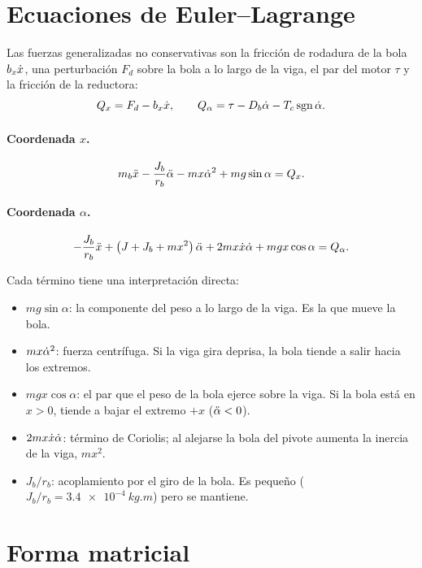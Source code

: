 \section{Ecuaciones de Euler--Lagrange}

Las fuerzas generalizadas no conservativas son la fricción de rodadura de la bola $b_x\dot{x}$, una perturbación $F_d$ sobre la bola a lo largo de la viga, el par del motor $\tau$ y la fricción de la reductora:
\begin{equation}
  Q_x = F_d - b_x\dot{x},\qquad
  Q_\alpha = \tau - D_b\dot{\alpha} - T_c\operatorname{sgn}\dot{\alpha} .
\end{equation}

\paragraph{Coordenada $x$.}
\begin{equation}
  m_b\ddot{x} - \frac{J_b}{r_b}\ddot{\alpha} - m x\dot{\alpha}^2 + m g\sin\alpha = Q_x .
  \label{eq:el1}
\end{equation}

\paragraph{Coordenada $\alpha$.}
\begin{equation}
  -\frac{J_b}{r_b}\ddot{x} + \left(J+J_b+mx^2\right)\ddot{\alpha} + 2m x\dot{x}\dot{\alpha} + m g x\cos\alpha = Q_\alpha .
  \label{eq:el2}
\end{equation}

Cada término tiene una interpretación directa:
\begin{itemize}
  \item $m g\sin\alpha$: la componente del peso a lo largo de la viga. Es la que mueve la bola.
  \item $m x\dot{\alpha}^2$: fuerza centrífuga. Si la viga gira deprisa, la bola tiende a salir hacia los extremos.
  \item $m g x\cos\alpha$: el par que el peso de la bola ejerce sobre la viga. Si la bola está en $x>0$, tiende a bajar el extremo $+x$ ($\ddot{\alpha}<0$).
  \item $2m x\dot{x}\dot{\alpha}$: término de Coriolis; al alejarse la bola del pivote aumenta la inercia de la viga, $mx^2$.
  \item $J_b/r_b$: acoplamiento por el giro de la bola. Es pequeño ($J_b/r_b=\SI{3.4e-4}{kg.m}$) pero se mantiene.
\end{itemize}

\section{Forma matricial}

